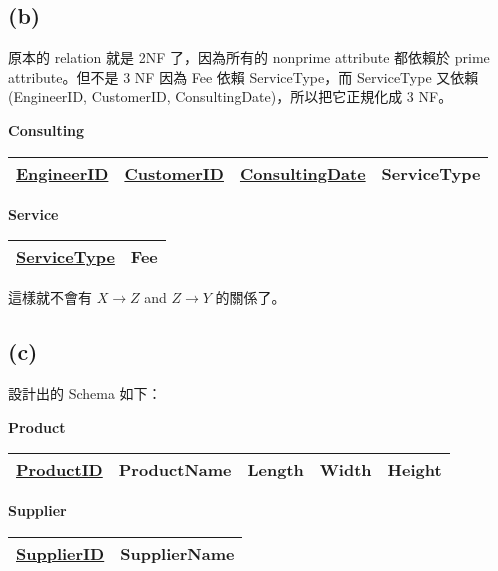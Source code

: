 \documentclass{article}
\begin{document}
\subsection*{(b)}
原本的 relation 就是 2NF 了，因為所有的 nonprime attribute 都依賴於 prime attribute。但不是 3 NF 因為 Fee 依賴 ServiceType，而 ServiceType 又依賴 (EngineerID, CustomerID, ConsultingDate)，所以把它正規化成 3 NF。\\

\begin{table}[H]
    \centering
      \textbf{Consulting} \\
      \begin{tabular}{|c|c|c|c|}
        \hline
        \underline{EngineerID} & \underline{CustomerID} & \underline{ConsultingDate} & ServiceType \\
        \hline
        \end{tabular}
\end{table}

    




\begin{table}[H]
    \centering
      \textbf{Service} \\
      \begin{tabular}{|c|c|}
        \hline
        \underline{ServiceType} & Fee \\
        \hline
        \end{tabular}
\end{table}

這樣就不會有 $X \rightarrow Z$ and $Z \rightarrow Y$ 的關係了。



\subsection*{(c)}
設計出的 Schema 如下：
\begin{table}[H]
    \centering
    \textbf{Product} \\
    \begin{tabular}{|c|c|c|c|c|}
        \hline
        \underline{ProductID} & ProductName & Length & Width & Height \\
        \hline
    \end{tabular}
\end{table}

\begin{table}[H]
    \centering
    \textbf{Supplier} \\
    \begin{tabular}{|c|c|}
        \hline
        \underline{SupplierID} & SupplierName \\
        \hline
    \end{tabular}
\end{table}
\end{document}
